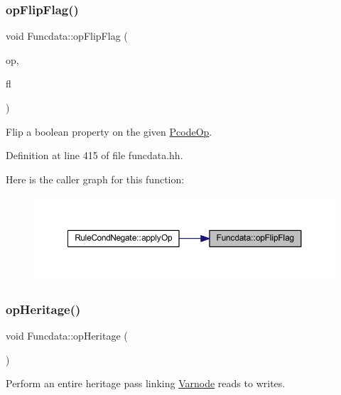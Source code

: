 \subsubsection{\texorpdfstring{opFlipFlag()}{opFlipFlag()}}
{\footnotesize\ttfamily void Funcdata\+::op\+Flip\+Flag (\begin{DoxyParamCaption}\item[{\mbox{\hyperlink{class_pcode_op}{Pcode\+Op}} $\ast$}]{op,  }\item[{uint4}]{fl }\end{DoxyParamCaption})\hspace{0.3cm}{\ttfamily [inline]}}



Flip a boolean property on the given \mbox{\hyperlink{class_pcode_op}{Pcode\+Op}}. 



Definition at line 415 of file funcdata.\+hh.

Here is the caller graph for this function\+:
\nopagebreak
\begin{figure}[H]
\begin{center}
\leavevmode
\includegraphics[width=350pt]{class_funcdata_a6f4a7f3cd801ead4d0bea3b234461eb7_icgraph}
\end{center}
\end{figure}
\mbox{\label{class_funcdata_a99d243f1e771d6e220330feb534a3fee}} 
\subsubsection{\texorpdfstring{opHeritage()}{opHeritage()}}
{\footnotesize\ttfamily void Funcdata\+::op\+Heritage (\begin{DoxyParamCaption}\item[{void}]{ }\end{DoxyParamCaption})\hspace{0.3cm}{\ttfamily [inline]}}



Perform an entire heritage pass linking \mbox{\hyperlink{class_varnode}{Varnode}} reads to writes. 



